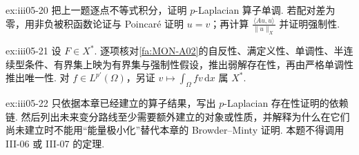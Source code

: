 \begin{FAExercise}[严格单调性与强制性]{ex:iii05-20}
把上一题逐点不等式积分，证明 \(\displaystyle p\)-Laplacian 算子单调. 若配对差为零，用非负被积函数论证与 Poincaré 证明 \(\displaystyle u=v\)；再计算 \(\displaystyle\frac{\langle Au,u\rangle}{\|u\|_X}\) 并证明强制性.
\end{FAExercise}

\begin{FAExercise}{ex:iii05-21}
设 \(\displaystyle F\in X^*\). 逐项核对\autoref{fa:MON-A02}的自反性、满定义性、单调性、半连续型条件、有界集上映为有界集与强制性假设，推出弱解存在性，再由严格单调性推出唯一性. 对 \(\displaystyle f\in L^{p'}(\Omega)\)，另证 \(\displaystyle v\mapsto\int_\Omega fv\,\mathrm{d}x\) 属 \(\displaystyle X^*\).
\end{FAExercise}

\begin{FAExercise}{ex:iii05-22}
只依据本章已经建立的算子结果，写出 \(\displaystyle p\)-Laplacian 存在性证明的依赖链. 然后列出未来变分路线至少需要额外建立的对象或性质，并解释为什么在它们尚未建立时不能用“能量极小化”替代本章的 Browder--Minty 证明. 本题不得调用 III-06 或 III-07 的定理.
\end{FAExercise}
